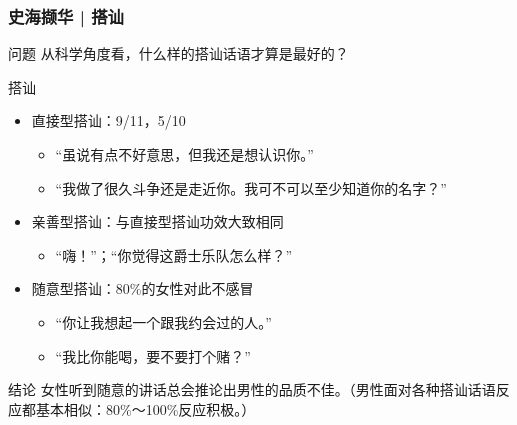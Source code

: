 \begin{frame}
  \frametitle{史海撷华 | 搭讪}
  \vspace{-0.7em}
  \begin{block}{问题}
    从科学角度看，什么样的搭讪话语才算是最好的？
  \end{block}
  \vspace{-0.7em}
  \pause
  \begin{block}{搭讪}
    \begin{itemize}
      \item 直接型搭讪：9/11，5/10
        \begin{itemize}
          \item “虽说有点不好意思，但我还是想认识你。”
          \item “我做了很久斗争还是走近你。我可不可以至少知道你的名字？”
        \end{itemize}
      \item 亲善型搭讪：与直接型搭讪功效大致相同
        \begin{itemize}
          \item “嗨！”；“你觉得这爵士乐队怎么样？”
        \end{itemize}
      \item 随意型搭讪：80\%的女性对此不感冒
        \begin{itemize}
          \item “你让我想起一个跟我约会过的人。”
          \item “我比你能喝，要不要打个赌？”
        \end{itemize}
    \end{itemize}
  \end{block}
  \vspace{-0.7em}
  \pause
  \begin{block}{结论}
    女性听到随意的讲话总会推论出男性的品质不佳。（男性面对各种搭讪话语反应都基本相似：80\%～100\%反应积极。）
  \end{block}
\end{frame}

